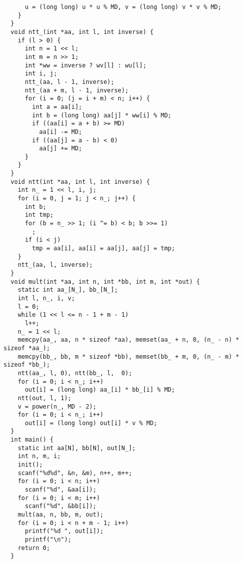 \begin{lstlisting}
      u = (long long) u * u % MD, v = (long long) v * v % MD;
    }
  }
  void ntt_(int *aa, int l, int inverse) {
    if (l > 0) {
      int n = 1 << l;
      int m = n >> 1;
      int *ww = inverse ? wv[l] : wu[l];
      int i, j;
      ntt_(aa, l - 1, inverse);
      ntt_(aa + m, l - 1, inverse);
      for (i = 0; (j = i + m) < n; i++) {
        int a = aa[i];
        int b = (long long) aa[j] * ww[i] % MD;
        if ((aa[i] = a + b) >= MD)
          aa[i] -= MD;
        if ((aa[j] = a - b) < 0)
          aa[j] += MD;
      }
    }
  }
  void ntt(int *aa, int l, int inverse) {
    int n_ = 1 << l, i, j;
    for (i = 0, j = 1; j < n_; j++) {
      int b;
      int tmp;
      for (b = n_ >> 1; (i ^= b) < b; b >>= 1)
        ;
      if (i < j)
        tmp = aa[i], aa[i] = aa[j], aa[j] = tmp;
    }
    ntt_(aa, l, inverse);
  }
  void mult(int *aa, int n, int *bb, int m, int *out) {
    static int aa_[N_], bb_[N_];
    int l, n_, i, v;
    l = 0;
    while (1 << l <= n - 1 + m - 1)
      l++;
    n_ = 1 << l;
    memcpy(aa_, aa, n * sizeof *aa), memset(aa_ + n, 0, (n_ - n) * sizeof *aa_);
    memcpy(bb_, bb, m * sizeof *bb), memset(bb_ + m, 0, (n_ - m) * sizeof *bb_);
    ntt(aa_, l, 0), ntt(bb_, l,  0);
    for (i = 0; i < n_; i++)
      out[i] = (long long) aa_[i] * bb_[i] % MD;
    ntt(out, l, 1);
    v = power(n_, MD - 2);
    for (i = 0; i < n_; i++)
      out[i] = (long long) out[i] * v % MD;
  }
  int main() {
    static int aa[N], bb[N], out[N_];
    int n, m, i;
    init();
    scanf("%d%d", &n, &m), n++, m++;
    for (i = 0; i < n; i++)
      scanf("%d", &aa[i]);
    for (i = 0; i < m; i++)
      scanf("%d", &bb[i]);
    mult(aa, n, bb, m, out);
    for (i = 0; i < n + m - 1; i++)
      printf("%d ", out[i]);
      printf("\n");
    return 0;
  }
\end{lstlisting}

